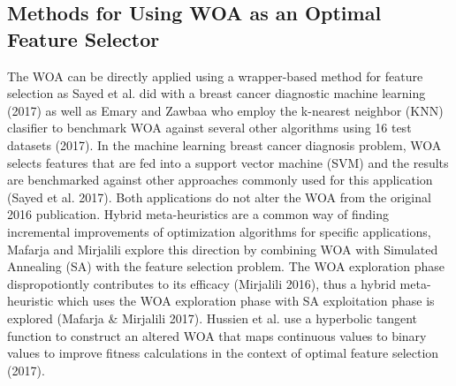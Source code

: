 \documentclass[11pt]{article}
\begin{document}
{{\subsection*{Methods for Using WOA as an Optimal Feature Selector} {
    The WOA can be directly applied using a wrapper-based method for feature selection as Sayed et al. did with a breast cancer diagnostic machine learning (2017) as well as Emary and Zawbaa who employ the k-nearest neighbor (KNN) clasifier to benchmark WOA against several other algorithms using 16 test datasets (2017).
    In the machine learning breast cancer diagnosis problem, WOA selects features that are fed into a support vector machine (SVM) and the results are benchmarked against other approaches commonly used for this application (Sayed et al. 2017).
    Both applications do not alter the WOA from the original 2016 publication.
    Hybrid meta-heuristics are a common way of finding incremental improvements of optimization algorithms for specific applications, Mafarja and Mirjalili explore this direction by combining WOA with Simulated Annealing (SA) with the feature selection problem.
    The WOA exploration phase dispropotiontly contributes to its efficacy (Mirjalili 2016), thus a hybrid meta-heuristic which uses the WOA exploration phase with SA exploitation phase is explored (Mafarja \& Mirjalili 2017).
    Hussien et al. use a hyperbolic tangent function to construct an altered WOA that maps continuous values to binary values to improve fitness calculations in the context of optimal feature selection (2017).
}

}}
\end{document}

